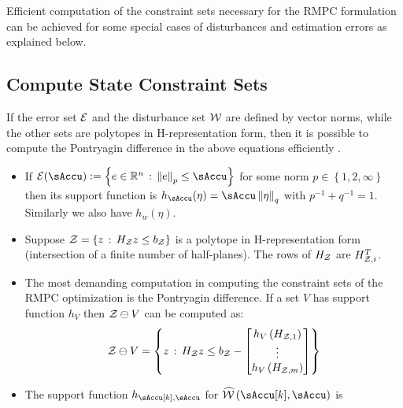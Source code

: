 Efficient computation of the constraint sets necessary for the RMPC formulation can be achieved for some special cases of disturbances and estimation errors as explained below.

\subsection{Compute State Constraint Sets}
\label{sec:ComputePontryagin}

If the error set $\mathcal{E}$ and the disturbance set $\mathcal{W}$ are defined
by vector norms, while the other sets are polytopes in H-representation
form, then it is possible to compute the Pontryagin difference in
the above equations efficiently \cite{setcomp}.%
\begin{itemize}
\item If $\ESet(\sAccu)\definedas\left\{ e\in\RR^{n}\SuchThat\norm{e}_{p}\leq\sAccu\right\} $
for some norm $p\in\left\{ 1,2,\infty\right\} $ then its support function
is $h_{\sAccu}(\eta)=\sAccu\norm{\eta}_{q}$ with $p^{-1}+q^{-1}=1$.
Similarly we also have $h_{w}(\eta)$.
\item Suppose $\mathcal{Z}=\left\{ z\,:\, H_{\mathcal{Z}}z\leq b_{\mathcal{Z}}\right\} $
is a polytope in H-representation form (\ie intersection of a finite number
of half-planes). The rows of $H_{\mathcal{Z}}$ are $H_{\mathcal{Z},i}^{T}$.
\item The most demanding computation in computing the constraint sets of the RMPC optimization is the Pontryagin difference.  If a set $V$ has support function $h_{V}$ then $\mathcal{Z} \ominus V$ can be computed as:
\begin{equation*}
      \mathcal{Z} \ominus V
      =\left\{ z\,:\, H_{\mathcal{Z}}z\leq b_{\mathcal{Z}} -
       \begin{bmatrix}h_{V}\left(H_{\mathcal{Z},1}\right)\\
         \vdots\\
         h_{V}\left(H_{\mathcal{Z},m}\right)
       \end{bmatrix}\right\} 
 \end{equation*}
%
\item The support function $h_{\sAccu[k],\sAccu}$ for $\WhSet\left(\sAccu[k],\sAccu\right)$ is

\end{itemize}
